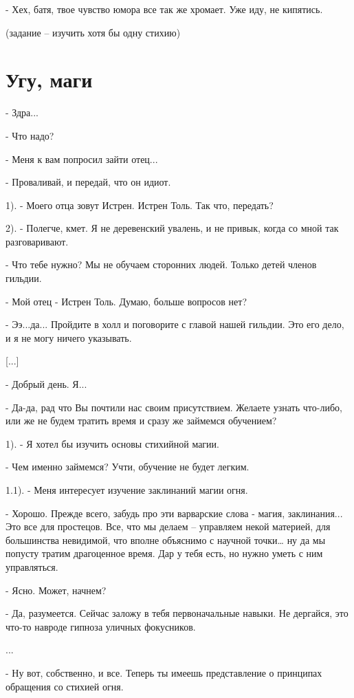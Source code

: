 \documentclass[12pt,a4paper]{book}
\begin{document}
- Хех, батя, твое чувство юмора все так же хромает. Уже иду, не кипятись.

(задание – изучить хотя бы одну стихию)

\section{Угу, маги}

- Здра...

- Что надо?

- Меня к вам попросил зайти отец...

- Проваливай, и передай, что он идиот.

1). - Моего отца зовут Истрен. Истрен Толь. Так что, передать?

2). - Полегче, кмет. Я не деревенский увалень, и не привык, когда со мной так разговаривают.

- Что тебе нужно? Мы не обучаем сторонних людей. Только детей членов гильдии.

- Мой отец - Истрен Толь. Думаю, больше вопросов нет?

- Ээ...да... Пройдите в холл и поговорите с главой нашей гильдии. Это его дело, и я не могу ничего указывать.

[...]

- Добрый день. Я...

- Да-да, рад что Вы почтили нас своим присутствием. Желаете узнать что-либо, или же не будем тратить время и сразу же займемся обучением?

1). - Я хотел бы изучить основы стихийной магии.

- Чем именно займемся? Учти, обучение не будет легким.

1.1). - Меня интересует изучение заклинаний магии огня.

- Хорошо. Прежде всего, забудь про эти варварские слова - магия, заклинания... Это все для простецов. Все, что мы делаем – управляем некой материей, для большинства невидимой, что вполне объяснимо с научной точки… ну да мы попусту тратим драгоценное время. Дар у тебя есть, но нужно уметь с ним управляться.

- Ясно. Может, начнем?

- Да, разумеется. Сейчас заложу в тебя первоначальные навыки. Не дергайся, это что-то навроде гипноза уличных фокусников.

...

- Ну вот, собственно, и все. Теперь ты имеешь представление о принципах обращения со стихией огня.
\end{document}
